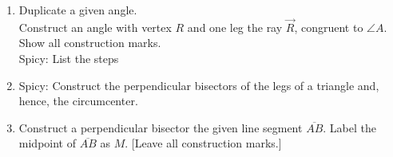 \begin{enumerate}
\item Duplicate a given angle.\\[0.5cm]
  \hspace{1cm} Construct an angle with vertex $R$ and one leg the ray $\overrightarrow{R}$, congruent to $\angle A$. Show all construction marks.\\[0.5cm]
    Spicy: List the steps\\
    \vspace{1cm}
    \begin{center}
    \end{center}
\newpage

\item Spicy: Construct the perpendicular bisectors of the legs of a triangle and, hence, the circumcenter.\\
  \vspace{3cm}
  \begin{center}
  \end{center}

\item Construct a perpendicular bisector the given line segment $\overline{AB}$. Label the midpoint of $\overline{AB}$ as $M$.  [Leave all construction marks.]\\
  \vspace{2cm}
  \begin{center}
  \end{center}
  \vspace{3cm}


\end{enumerate}
